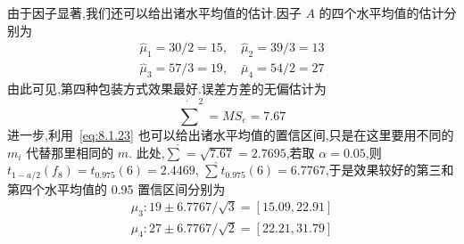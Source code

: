 \begin{example}
  由于因子显著,我们还可以给出诸水平均值的估计.因子 $A$ 的四个水平均值的估计分别为 
  \begin{gather*}
    \hat{\mu}_{1}=30 / 2=15, \quad \hat{\mu}_{2}=39 / 3=13 \\
    \hat{\mu}_{3}=57 / 3=19, \quad \bar{\mu}_{4}=54 / 2=27
  \end{gather*} 
  由此可见,第四种包装方式效果最好.误差方差的无偏估计为
  \begin{equation*}
    \dot{\sum}^{2}=M S_{e}=7.67
  \end{equation*}
  进一步,利用~\eqref{eq:8.1.23} 也可以给出诸水平均值的置信区间,只是在这里要用不同的 $m_i$ 代替那里相同的 $m$. 此处,$\hat{\sum} = \sqrt{7.67}=2.7695$,若取 $\alpha=0.05$,则 $t_{1-a / 2}\left(f_{8}\right)=t_{0.975}(6)=2.4469$, $\hat{\sum} t_{0.975}(6)=6.7767$,于是效果较好的第三和第四个水平均值的 0.95 置信区间分别为
\begin{gather*}
  \mu_{3} : 19 \pm 6.7767 / \sqrt{3}=[15.09,22.91] \\
  \mu_{4} : 27 \pm 6.7767 / \sqrt{2}=[22.21,31.79]
\end{gather*}
\end{example}

